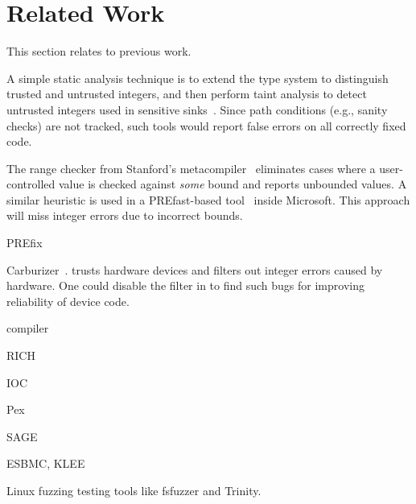 \section{Related Work}
\label{s:relwk}

This section relates \sys to previous work.

A simple static analysis technique is to extend the type system to
distinguish trusted and untrusted integers, and then perform taint
analysis to detect untrusted integers used in sensitive sinks~\cite{cqual,
lclint}.  Since path conditions (e.g., sanity checks) are not
tracked, such tools would report false errors on all correctly fixed
code.

The range checker from Stanford's metacompiler~\cite{range-checker}
eliminates cases where a user-controlled value is checked against
\emph{some} bound and reports unbounded values.  A similar heuristic
is used in a PREfast-based tool~\cite{prefast} inside Microsoft.
This approach will miss integer errors due to incorrect bounds.

PREfix~\cite{moy:prefix}

Carburizer~\cite{kadav:tolerating}.
\sys trusts hardware devices and filters out integer errors
caused by hardware.  One could disable the filter in \sys
to find such bugs for improving reliability of device code.


compiler

RICH~\cite{brumley:rich}

IOC

Pex

SAGE

ESBMC, KLEE

Linux fuzzing testing tools
like fsfuzzer and Trinity.
